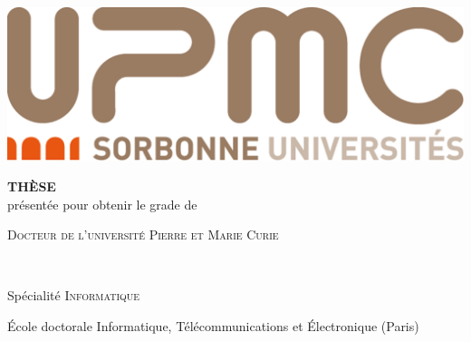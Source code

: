 




\frontmatter %

\pagestyle{plain} %


\thispagestyle{empty}

\begin{titlepage}
        \begin{center}
            \includegraphics[width=0.3\linewidth]{upmc-logo.png}
        \end{center}
       
        \begin{center}
           
            \textbf{TH\`ESE}\\
            présentée pour obtenir le grade de\\
            \vspace*{0.5cm}
            \begin{center}\textsc{Docteur de l'université Pierre et Marie Curie}\end{center} \ \\
           
            \vspace*{0.5cm}
           
            Sp\'ecialit\'e \textsc{Informatique}\ \\
           
            \vspace*{0.5cm}
           
            École doctorale Informatique, Télécommunications et Électronique (Paris)
            \vspace*{1cm}
           
        \end{center}
       

\end{titlepage}
